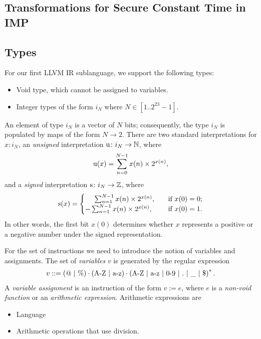 \subsection{Transformations for Secure Constant Time in IMP}
\subsection{Types}
For our first LLVM IR sublanguage, we support the following types:
\begin{itemize}
\item Void type, which cannot be assigned to variables.
\item Integer types of the form $i_N$ where $N\in [1..2^{23}-1]$.
\end{itemize}
An element of type $i_N$ is a vector of $N$ bits; consequently, the type $i_N$ is populated by maps of the form $N\rightarrow 2$. There are two standard interpretations for $x\colon i_N$, an \emph{unsigned} interpretation $\text{u}\colon i_N\rightarrow \mathbb{N}$, where 
\begin{align}
\text{u}(x)= \sum_{n=0}^{N-1} x(n)\times2^{x(n)},
\end{align}
and a \emph{signed} interpretation $\text{s}\colon i_N\rightarrow \mathbb{Z}$, where
\begin{align}
\text{s}(x)= 
\begin{cases}
\ \ \ \ \sum_{n=1}^{N-1} x(n)\times2^{x(n)},\quad &\text{if $x(0)=0$};\\
-\sum_{n=1}^{N-1} x(n)\times2^{x(n)},\quad &\text{if $x(0)=1$}.
\end{cases}
\end{align}
In other words, the first bit $x(0)$ determines whether $x$ represents a positive or a negative number under the signed representation.

For the set of instructions we need to introduce the notion of variables and assignments. The set of \emph{variables} $v$ is generated by the regular expression
\begin{align}
v::= (@\ |\ \%)\cdot\left(\text{A-Z\ |\ a-z}\right)\cdot\left(\text{A-Z\ |\ a-z\ |\ 0-9\ |\ .\ |\ \_\ |\ \$}\right)^{*}.
\end{align}
A \emph{variable assignment} is an instruction of the form $v:=e$, where $e$ is a \emph{non-void function} or an \emph{arithmetic expression}. Arithmetic expressions are 
\begin{itemize}
\item Language  
\item Arithmetic operations that use division.
\end{itemize}

